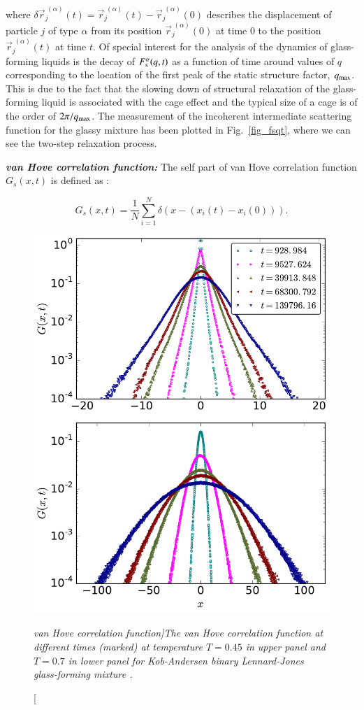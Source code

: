     where $\delta \vec{r}_j^{\; (\alpha)}(t)= \vec{r}_j^{\; (\alpha)}(t) - \vec{r}_j^{\; (\alpha)}(0)$ describes the displacement of particle $j$ of type $\alpha$ from its position $\vec{r}_j^{\; (\alpha)}(0)$ at time 0 to the position $\vec{r}_j^{\; (\alpha)}(t)$ at time $t$. Of special interest for the analysis of the dynamics of glass-forming liquids is the decay of $F_{\rm s}^{\alpha}(q,t)$ as a function of time around values of $q$ corresponding to the location of the first peak of the static structure factor, $q_{\rm max}$. This is due to the fact that the slowing down of structural relaxation of the glass-forming liquid is associated with the cage effect \cite{binder2011} and the typical size of a cage is of the order of $2 \pi/q_{\rm max}$. The measurement of the incoherent intermediate scattering function for the glassy mixture has been plotted in Fig.~\ref{fig_fsqt}, where we can see the two-step relaxation process.
    
    {\bf \em van Hove correlation function:} The self part of van Hove correlation function $G_s(x,t)$ is defined as \cite{hansen2013}:
    
    \begin{equation}
        G_s(x,t) =\frac{1}{N} \sum_{i=1}^N \delta(x-(x_i(t)-x_i(0))).
    \end{equation}
    
    \begin{figure}[hbt!]
    \includegraphics[width=12cm]{figs/fig_vanHove.pdf}
    \centering
    \caption[\em van Hove correlation function]{The van Hove correlation function at different times (marked) at temperature $T=0.45$ in upper panel and $T=0.7$ in lower panel for Kob-Andersen binary Lennard-Jones glass-forming mixture \cite{kob1995testing}.\label{fig_vanHove}}
    \end{figure}

